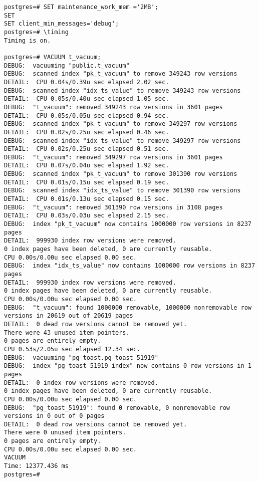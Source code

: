 \begin{lstlisting}[style=pgsql]
postgres=# SET maintenance_work_mem ='2MB';
SET
SET client_min_messages='debug';
postgres=# \timing
Timing is on.

postgres=# VACUUM t_vacuum;
DEBUG:  vacuuming "public.t_vacuum"
DEBUG:  scanned index "pk_t_vacuum" to remove 349243 row versions
DETAIL:  CPU 0.04s/0.39u sec elapsed 2.02 sec.
DEBUG:  scanned index "idx_ts_value" to remove 349243 row versions
DETAIL:  CPU 0.05s/0.40u sec elapsed 1.05 sec.
DEBUG:  "t_vacuum": removed 349243 row versions in 3601 pages
DETAIL:  CPU 0.05s/0.05u sec elapsed 0.94 sec.
DEBUG:  scanned index "pk_t_vacuum" to remove 349297 row versions
DETAIL:  CPU 0.02s/0.25u sec elapsed 0.46 sec.
DEBUG:  scanned index "idx_ts_value" to remove 349297 row versions
DETAIL:  CPU 0.02s/0.25u sec elapsed 0.51 sec.
DEBUG:  "t_vacuum": removed 349297 row versions in 3601 pages
DETAIL:  CPU 0.07s/0.04u sec elapsed 1.92 sec.
DEBUG:  scanned index "pk_t_vacuum" to remove 301390 row versions
DETAIL:  CPU 0.01s/0.15u sec elapsed 0.19 sec.
DEBUG:  scanned index "idx_ts_value" to remove 301390 row versions
DETAIL:  CPU 0.01s/0.13u sec elapsed 0.15 sec.
DEBUG:  "t_vacuum": removed 301390 row versions in 3108 pages
DETAIL:  CPU 0.03s/0.03u sec elapsed 2.15 sec.
DEBUG:  index "pk_t_vacuum" now contains 1000000 row versions in 8237 pages
DETAIL:  999930 index row versions were removed.
0 index pages have been deleted, 0 are currently reusable.
CPU 0.00s/0.00u sec elapsed 0.00 sec.
DEBUG:  index "idx_ts_value" now contains 1000000 row versions in 8237 pages
DETAIL:  999930 index row versions were removed.
0 index pages have been deleted, 0 are currently reusable.
CPU 0.00s/0.00u sec elapsed 0.00 sec.
DEBUG:  "t_vacuum": found 1000000 removable, 1000000 nonremovable row versions in 20619 out of 20619 pages
DETAIL:  0 dead row versions cannot be removed yet.
There were 43 unused item pointers.
0 pages are entirely empty.
CPU 0.53s/2.05u sec elapsed 12.34 sec.
DEBUG:  vacuuming "pg_toast.pg_toast_51919"
DEBUG:  index "pg_toast_51919_index" now contains 0 row versions in 1 pages
DETAIL:  0 index row versions were removed.
0 index pages have been deleted, 0 are currently reusable.
CPU 0.00s/0.00u sec elapsed 0.00 sec.
DEBUG:  "pg_toast_51919": found 0 removable, 0 nonremovable row versions in 0 out of 0 pages
DETAIL:  0 dead row versions cannot be removed yet.
There were 0 unused item pointers.
0 pages are entirely empty.
CPU 0.00s/0.00u sec elapsed 0.00 sec.
VACUUM
Time: 12377.436 ms
postgres=# 



\end{lstlisting}

